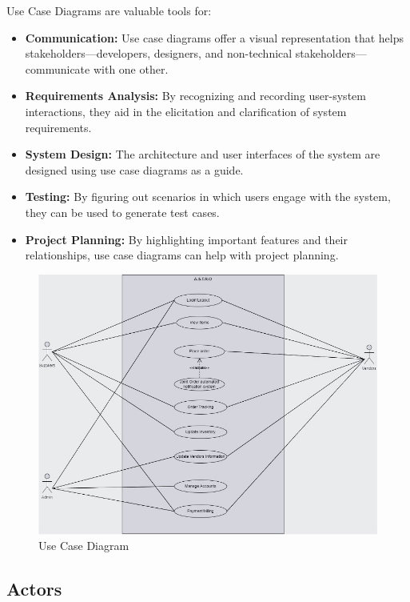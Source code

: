 Use Case Diagrams are valuable tools for:
\begin{itemize}
    \item \textbf{Communication:} Use case diagrams offer a visual representation that helps stakeholders—developers, designers, and non-technical stakeholders—communicate with one other.
    \item \textbf{Requirements Analysis:} By recognizing and recording user-system interactions, they aid in the elicitation and clarification of system requirements.
    \item \textbf{System Design:} The architecture and user interfaces of the system are designed using use case diagrams as a guide.
    \item \textbf{Testing:} By figuring out scenarios in which users engage with the system, they can be used to generate test cases.
    \item \textbf{Project Planning:} By highlighting important features and their relationships, use case diagrams can help with project planning.
\end{itemize}
\begin{figure}[h]
    \centering
    \includegraphics[width=1\textwidth]{Figures/Use case diagram.jpg}
    \caption{Use Case Diagram}
    \label{fig:use-case-diagram}
\end{figure}
\subsection{Actors}


